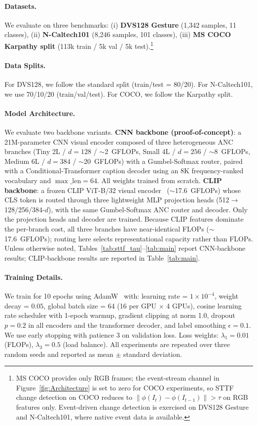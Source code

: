 \documentclass{article}
\begin{document}
\paragraph{Datasets.}
We evaluate on three benchmarks:
(i) \textbf{DVS128 Gesture} (1,342 samples, 11 classes),
(ii) \textbf{N-Caltech101} (8,246 samples, 101 classes),
(iii) \textbf{MS COCO Karpathy split} (113k train / 5k val / 5k test).\footnote{MS COCO provides only RGB frames; the event-stream channel in Figure~\ref{fig:Architecture} is set to zero for COCO experiments, so STTF change detection on COCO reduces to $\|\phi(I_t)-\phi(I_{t-1})\|>\tau$ on RGB features only. Event-driven change detection is exercised on DVS128 Gesture and N-Caltech101, where native event data is available.}

\paragraph{Data Splits.}
For DVS128, we follow the standard split (train/test = 80/20).
For N-Caltech101, we use 70/10/20 (train/val/test).
For COCO, we follow the Karpathy split.

\paragraph{Model Architecture.}
We evaluate two backbone variants.
\textbf{CNN backbone (proof-of-concept)}: a 21M-parameter CNN visual encoder composed of three heterogeneous ANC branches (Tiny 2L / $d{=}128$ / $\sim$2~GFLOPs, Small 4L / $d{=}256$ / $\sim$8~GFLOPs, Medium 6L / $d{=}384$ / $\sim$20~GFLOPs) with a Gumbel-Softmax router, paired with a Conditional-Transformer caption decoder using an 8K frequency-ranked vocabulary and $\max\_{\text{len}}{=}64$. All weights trained from scratch.
\textbf{CLIP backbone}: a frozen CLIP ViT-B/32 visual encoder~\cite{radford2021clip} ($\sim$17.6~GFLOPs) whose CLS token is routed through three lightweight MLP projection heads (512$\to$128/256/384-$d$), with the same Gumbel-Softmax ANC router and decoder. Only the projection heads and decoder are trained. Because CLIP features dominate the per-branch cost, all three branches have near-identical FLOPs ($\sim$17.6~GFLOPs); routing here selects representational capacity rather than FLOPs. Unless otherwise noted, Tables~\ref{tab:sttf_tau}--\ref{tab:main} report CNN-backbone results; CLIP-backbone results are reported in Table~\ref{tab:main}.

\paragraph{Training Details.}
We train for 10 epochs using AdamW~\cite{loshchilov2019adamw} with:
learning rate = $1 \times 10^{-4}$,
weight decay = $0.05$,
global batch size = 64 (16 per GPU $\times$ 4 GPUs),
cosine learning rate scheduler with 1-epoch warmup,
gradient clipping at norm 1.0,
dropout $p=0.2$ in all encoders and the transformer decoder,
and label smoothing $\epsilon=0.1$.
We use early stopping with patience 3 on validation loss.
Loss weights: $\lambda_1=0.01$ (FLOPs), $\lambda_3=0.5$ (load balance).
All experiments are repeated over three random seeds and reported as mean $\pm$ standard deviation.
\end{document}
